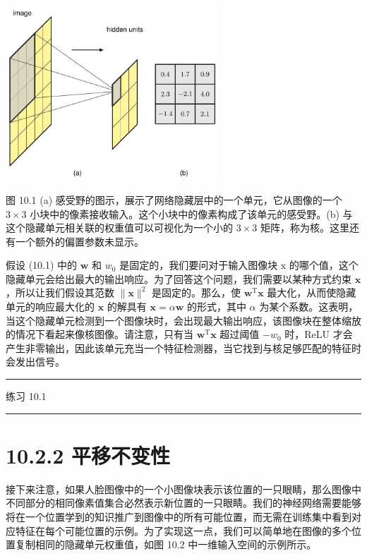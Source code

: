 \documentclass[10pt]{article}
\newcommand{\HRule}{\begin{center}\rule{0.9\linewidth}{0.2mm}\end{center}}
\begin{document}
\begin{center}
\includegraphics[max width=0.6\textwidth]{images/0194e279-9b28-703a-88f4-c3ac21e2010d_310_694_349_851_696_0.jpg}
\end{center}
\hspace*{3em} 

图 10.1 (a) 感受野的图示，展示了网络隐藏层中的一个单元，它从图像的一个 \(3 \times  3\) 小块中的像素接收输入。这个小块中的像素构成了该单元的感受野。(b) 与这个隐藏单元相关联的权重值可以可视化为一个小的 \(3 \times  3\) 矩阵，称为核。这里还有一个额外的偏置参数未显示。

假设 (10.1) 中的 \(\mathbf{w}\) 和 \({w}_{0}\) 是固定的，我们要问对于输入图像块 \(\mathrm{x}\) 的哪个值，这个隐藏单元会给出最大的输出响应。为了回答这个问题，我们需要以某种方式约束 \(\mathbf{x}\) ，所以让我们假设其范数 \(\parallel \mathbf{x}{\parallel }^{2}\) 是固定的。那么，使 \({\mathbf{w}}^{\mathrm{T}}\mathbf{x}\) 最大化，从而使隐藏单元的响应最大化的 \(\mathbf{x}\) 的解具有 \(\mathbf{x} = \alpha \mathbf{w}\) 的形式，其中 \(\alpha\) 为某个系数。这表明，当这个隐藏单元检测到一个图像块时，会出现最大输出响应，该图像块在整体缩放的情况下看起来像核图像。请注意，只有当 \({\mathbf{w}}^{\mathrm{T}}\mathbf{x}\) 超过阈值 \(- {w}_{0}\) 时，ReLU 才会产生非零输出，因此该单元充当一个特征检测器，当它找到与核足够匹配的特征时会发出信号。

\HRule

练习 10.1

\HRule

\section*{10.2.2 平移不变性}

接下来注意，如果人脸图像中的一个小图像块表示该位置的一只眼睛，那么图像中不同部分的相同像素值集合必然表示新位置的一只眼睛。我们的神经网络需要能够将在一个位置学到的知识推广到图像中的所有可能位置，而无需在训练集中看到对应特征在每个可能位置的示例。为了实现这一点，我们可以简单地在图像的多个位置复制相同的隐藏单元权重值，如图 10.2 中一维输入空间的示例所示。
\end{document}
